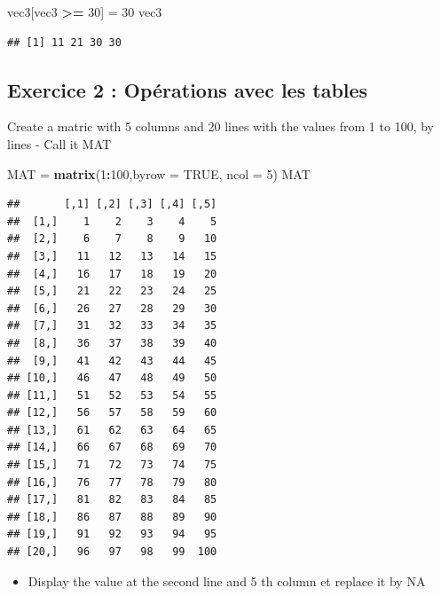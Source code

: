 \documentclass[]{article}
\newenvironment{Shaded}{\begin{snugshade}}{\end{snugshade}}
\newcommand{\KeywordTok}[1]{\textcolor[rgb]{0.13,0.29,0.53}{\textbf{#1}}}
\newcommand{\DataTypeTok}[1]{\textcolor[rgb]{0.13,0.29,0.53}{#1}}
\newcommand{\DecValTok}[1]{\textcolor[rgb]{0.00,0.00,0.81}{#1}}
\newcommand{\StringTok}[1]{\textcolor[rgb]{0.31,0.60,0.02}{#1}}
\newcommand{\OtherTok}[1]{\textcolor[rgb]{0.56,0.35,0.01}{#1}}
\newcommand{\OperatorTok}[1]{\textcolor[rgb]{0.81,0.36,0.00}{\textbf{#1}}}
\newcommand{\NormalTok}[1]{#1}
\providecommand{\tightlist}{%
  \setlength{\itemsep}{0pt}\setlength{\parskip}{0pt}}
\begin{document}
\begin{enumerate}
\begin{Shaded}
\begin{Highlighting}[]
\NormalTok{vec3[vec3 }\OperatorTok{>=}\StringTok{ }\DecValTok{30}\NormalTok{] =}\StringTok{ }\DecValTok{30}
\NormalTok{vec3}
\end{Highlighting}
\end{Shaded}

\begin{verbatim}
## [1] 11 21 30 30
\end{verbatim}
\end{enumerate}

\subsection{Exercice 2 : Opérations avec les
tables}\label{exercice-2-operations-avec-les-tables}

Create a matric with 5 columns and 20 lines with the values from 1 to
100, by lines - Call it MAT

\begin{Shaded}
\begin{Highlighting}[]
\NormalTok{MAT =}\StringTok{ }\KeywordTok{matrix}\NormalTok{(}\DecValTok{1}\OperatorTok{:}\DecValTok{100}\NormalTok{,}\DataTypeTok{byrow =} \OtherTok{TRUE}\NormalTok{, }\DataTypeTok{ncol =} \DecValTok{5}\NormalTok{)}
\NormalTok{MAT}
\end{Highlighting}
\end{Shaded}

\begin{verbatim}
##       [,1] [,2] [,3] [,4] [,5]
##  [1,]    1    2    3    4    5
##  [2,]    6    7    8    9   10
##  [3,]   11   12   13   14   15
##  [4,]   16   17   18   19   20
##  [5,]   21   22   23   24   25
##  [6,]   26   27   28   29   30
##  [7,]   31   32   33   34   35
##  [8,]   36   37   38   39   40
##  [9,]   41   42   43   44   45
## [10,]   46   47   48   49   50
## [11,]   51   52   53   54   55
## [12,]   56   57   58   59   60
## [13,]   61   62   63   64   65
## [14,]   66   67   68   69   70
## [15,]   71   72   73   74   75
## [16,]   76   77   78   79   80
## [17,]   81   82   83   84   85
## [18,]   86   87   88   89   90
## [19,]   91   92   93   94   95
## [20,]   96   97   98   99  100
\end{verbatim}

\begin{itemize}
\tightlist
\item
  Display the value at the second line and 5 th column et replace it by
  NA
\end{itemize}
\end{document}
